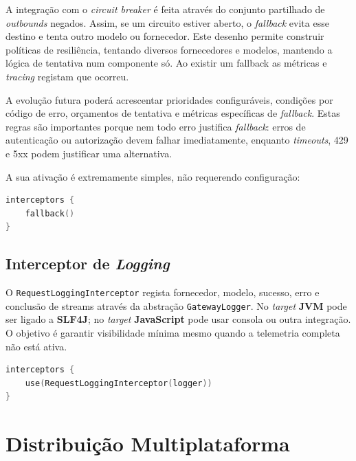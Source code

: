     A integração com o \textit{circuit breaker} é feita através do conjunto partilhado de \textit{outbounds} negados. Assim, se um circuito estiver aberto, o \textit{fallback} evita esse destino e tenta outro modelo ou fornecedor. Este desenho permite construir políticas de resiliência, tentando diversos fornecedores e modelos, mantendo a lógica de tentativa num componente só. Ao existir um fallback as métricas e \textit{tracing} registam que ocorreu.

    A evolução futura poderá acrescentar prioridades configuráveis, condições por código de erro, orçamentos de tentativa e métricas específicas de \textit{fallback}. Estas regras são importantes porque nem todo erro justifica \textit{fallback}: erros de autenticação ou autorização devem falhar imediatamente, enquanto \textit{timeouts}, 429 e 5xx podem justificar uma alternativa.

    A sua ativação é extremamente simples, não requerendo configuração:

    \vspace{0.5em}
    \begin{lstlisting}[language=kotlin, caption={DSL de configuração do \textit{interceptor} de \textit{fallback}}]
interceptors {
    fallback()
}
    \end{lstlisting}

    \subsection{Interceptor de \textit{Logging}}
    O \texttt{RequestLoggingInterceptor} regista fornecedor, modelo, sucesso, erro e conclusão de streams através da abstração \texttt{GatewayLogger}. No \textit{target} \textbf{JVM} pode ser ligado a \textbf{SLF4J}; no \textit{target} \textbf{JavaScript} pode usar consola ou outra integração. O objetivo é garantir visibilidade mínima mesmo quando a telemetria completa não está ativa.

    \vspace{0.5em}
    \begin{lstlisting}[language=kotlin, caption={Instalação do \textit{interceptor} de \textit{logging}}]
interceptors {
    use(RequestLoggingInterceptor(logger))
}
    \end{lstlisting}



   \section{Distribuição Multiplataforma}

